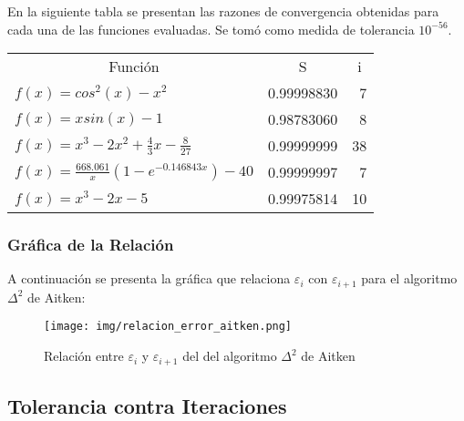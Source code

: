 \documentclass[a4paper,12pt]{article}
\begin{document}
En la siguiente tabla se presentan las razones de convergencia obtenidas para cada una de las funciones evaluadas. Se tomó como medida de tolerancia $10^{-56}$. \par

\begin{table}[ht!]
\begin{tabular}{llr}
\multicolumn{1}{c}{Función}                         & \multicolumn{1}{c}{S} & \multicolumn{1}{c}{i} \\
$f(x)=cos^2(x)-x^2$                                 & 0.99998830                & 7                    \\
$f(x)=xsin(x)-1$                                    & 0.98783060               & 8                    \\
$f(x)=x^3-2x^2+\frac{4}{3}x-\frac{8}{27}$           & 0.99999999               & 38                  \\
$f(x)=\frac{668.061}{x} (1 - e^{-0.146843 x}) - 40$ & 0.99999997                & 7                   \\
$f(x)=x^3-2x-5$                                     & 0.99975814                & 10                   
\end{tabular}
\end{table}

\vspace{-2em}

\subsubsection{Gráfica de la Relación}

A continuación se presenta la gráfica que relaciona $\varepsilon_i$ con $\varepsilon_{i+1}$ para el algoritmo $\Delta^2$ de Aitken: \par

\vspace{-1em}
\begin{figure}[ht!]
\centering
\texttt{[image: img/relacion\_error\_aitken.png]}
\vspace{-1em}
\caption{Relación entre $\varepsilon_i$ y $\varepsilon_{i+1}$ del del algoritmo $\Delta^2$ de Aitken}
\label{fig:relacion_error_aitken}
\end{figure}

\newpage

\subsection{Tolerancia contra Iteraciones}
\end{document}
